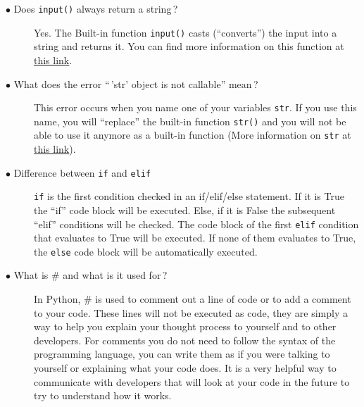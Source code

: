 \documentclass{article}
\newcommand{\inlinecode}[1]{\texttt{#1}}
\newcommand{\link}[2]{\textcolor{blue}{\href{#2}{#1}}}
\newcommand{\question}[1]{\item[$\bullet$ #1] \hfil}
\newenvironment{answer}{}{}
\newenvironment{faq}{\begin{description}}{\end{description}}
\begin{document}
\begin{faq}
				\question{Does \inlinecode{input()} always return a string\,?}
				
				\begin{answer}
					Yes. The Built-in function \inlinecode{input()} casts (``converts'') the input into a string and
					returns it. You can find more information on this function at \link{this link}{https://docs.python.org/3/library/functions.html\#input}.
				\end{answer}
				
				\question{What does the error ``\,'str' object is not callable'' mean\,?}
				
				\begin{answer}
					This error occurs when you name one of your variables \inlinecode{str}. If you use this
					name, you will ``replace'' the built-in function \inlinecode{str()} and you will not be able to
					use it anymore as a built-in function (More information on \inlinecode{str} at \link{this link}{https://docs.python.org/3/library/functions.html\#func-str}).
				\end{answer}
				
				\question{Difference between \inlinecode{if} and \inlinecode{elif}}
				
				\begin{answer}
					\inlinecode{if} is the first condition checked in an if/elif/else statement. If it is True the ``if''
					code block will be executed. Else, if it is False the subsequent ``elif'' conditions
					will be checked. The code block of the first \inlinecode{elif} condition that evaluates to
					True will be executed. If none of them evaluates to True, the \inlinecode{else} code block
					will be automatically executed.
				\end{answer}
				
				\question{What is \# and what is it used for\,?}
				
				\begin{answer}
					In Python, \# is used to comment out a line of code or to add a comment to
					your code. These lines will not be executed as code, they are simply a way to
					help you explain your thought process to yourself and to other developers.
					For comments you do not need to follow the syntax of the programming
					language, you can write them as if you were talking to yourself or explaining what
					your code does. It is a very helpful way to communicate with developers that will look
					at your code in the future to try to understand how it works.
				\end{answer}
				

\end{faq}
\end{document}

